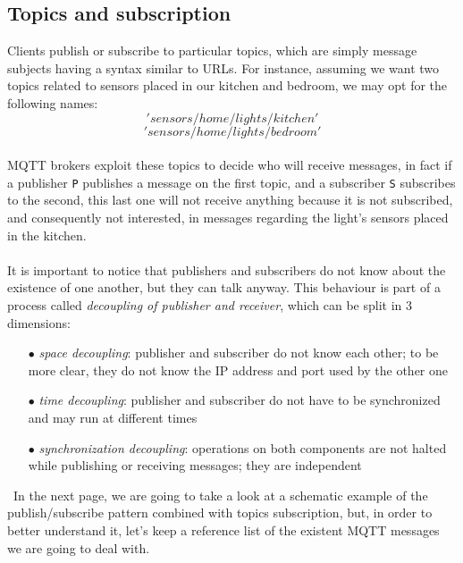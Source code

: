\documentclass[12pt]{report}
\begin{document}
\subsection{Topics and subscription}
\bigskip
Clients publish or subscribe to particular topics, which are simply message subjects having a syntax similar to URLs. For instance, assuming we want two topics related to sensors placed in our kitchen and bedroom, we may opt for the following names: $$'sensors/home/lights/kitchen'$$ $$'sensors/home/lights/bedroom'$$\\
MQTT brokers exploit these topics to decide who will receive messages, in fact if a publisher \texttt{P} publishes a message on the first topic, and a subscriber \texttt{S} subscribes to the second, this last one will not receive anything because it is not subscribed, and consequently not interested, in messages regarding the light's sensors placed in the kitchen.\\\\ 
It is important to notice that publishers and subscribers do not know about the existence of one another, but they can talk anyway.
This behaviour is part of a process called \emph{decoupling of publisher and receiver}, which can be split in 3 dimensions:

\begin{itemize}
  \setlength{\itemindent}{+4mm}
  \item[$\bullet$] \emph{space decoupling}: publisher and subscriber do not know each other; to be more clear, they do not know the IP address and port used by the other one
  \item[$\bullet$] \emph{time decoupling}: publisher and subscriber do not have to be synchronized and may run at different times
  \item[$\bullet$] \emph{synchronization decoupling}: operations on both components are not halted while publishing or receiving messages; they are independent
\end{itemize}\
In the next page, we are going to take a look at a schematic  example of the publish/subscribe pattern combined with topics subscription, but, in order to better understand it, let's keep a reference list of the existent MQTT messages we are going to deal with.
\end{document}
